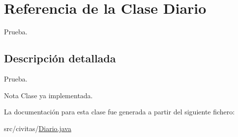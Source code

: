 \hypertarget{classDiario}{}\section{Referencia de la Clase Diario}
\label{classDiario}


Prueba.  




\subsection{Descripción detallada}
Prueba. 

\begin{DoxyNote}{Nota}
Clase ya implementada. 
\end{DoxyNote}


La documentación para esta clase fue generada a partir del siguiente fichero\+:\begin{DoxyCompactItemize}
\item 
src/civitas/\hyperlink{Diario_8java}{Diario.\+java}\end{DoxyCompactItemize}

